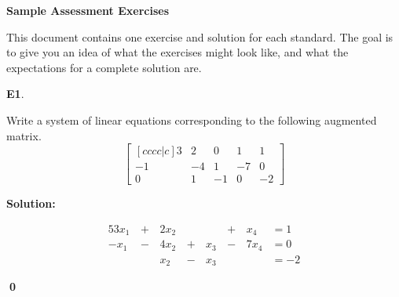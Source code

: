 \documentclass{article}
\newenvironment{problem}[1]
{
  \begin{flushleft}
  \textbf{#1}.
  \ignorespaces
}
{
  \end{flushleft}
}
\newenvironment{solution}
{
  \ignorespaces
  \textbf{Solution:}
}
{
  \ignorespacesafterend
  \begin{flushright}
  {\bfseries \qed}
  \end{flushright}
}
\begin{document}
\begin{center}
\Large \textbf{Sample Assessment Exercises}
\end{center}

This document contains one exercise and solution for each standard.
The goal is to give you an idea of what the exercises might look like,
and what the expectations for a complete solution are.

\begin{problem}{E1}
Write a system of linear equations corresponding to the following
augmented matrix.
\[
\begin{bmatrix}[cccc|c]
3 & 2 & 0 & 1 & 1 \\
-1 & -4 & 1 & -7 & 0 \\
0 & 1 & -1 & 0 & -2
\end{bmatrix}
\]
\end{problem}
\begin{solution}
\begin{alignat*}{5}
3x_1 &\,+\,& 2x_2 &\,\,& &\,+\,&x_4 &= 1 \\
-x_1 &\,-\,& 4x_2 &\,+\,&x_3&\,-\,&7x_4 &= 0 \\
&\,\,& x_2 &\,-\,&x_3 &\,\,&  &= -2
\end{alignat*}
\end{solution}
\end{document}
